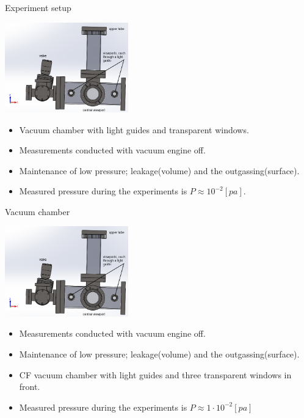 \documentclass{beamer}
\begin{document}
\begin{frame}{Experiment setup}
	\begin{center}		
		\includegraphics[width=0.4\textwidth,keepaspectratio]{chamber_front_names.PNG}
	\end{center}
	\begin{itemize}

		\item Vacuum chamber with light guides and transparent windows.
		\pause
		\item Measurements conducted with vacuum engine off.
		\item Maintenance of low pressure; leakage(volume) and the outgassing(surface).
		\item Measured pressure during the experiments is $P \approx  10^{−2} [pa]$.
		
	\end{itemize}
	
\end{frame}


\begin{frame}{Vacuum chamber}
	\begin{center}		
		\includegraphics[width=0.4\textwidth,keepaspectratio]{chamber_front_names.PNG}
	\end{center}
	\begin{itemize}

		
		\item Measurements conducted with vacuum engine off.
		\item Maintenance of low pressure; leakage(volume) and the outgassing(surface).
		\pause
		\item CF vacuum chamber with light guides and three transparent windows in front.
		\item Measured pressure during the experiments is $P \approx 1\cdot 10^{−2} [pa]$
	\end{itemize}
	
\end{frame}
\end{document}
